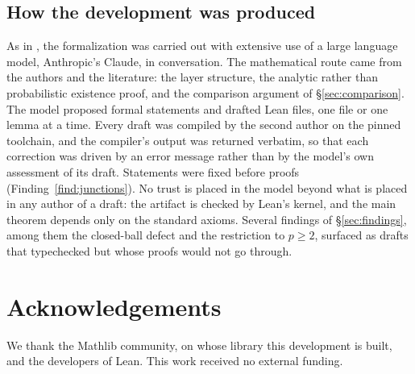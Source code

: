 \documentclass[11pt,reqno]{amsart}
\theoremstyle{plain}
\theoremstyle{definition}
\begin{document}
\subsection{How the development was produced}

As in \cite{AK26}, the formalization was carried out with extensive use of a
large language model, Anthropic's Claude, in conversation. The mathematical
route came from the authors and the literature: the layer structure, the
analytic rather than probabilistic existence proof, and the comparison argument
of \S\ref{sec:comparison}. The model proposed formal statements and drafted Lean
files, one file or one lemma at a time. Every draft was compiled by the second
author on the pinned toolchain, and the compiler's output was returned
verbatim, so that each correction was driven by an error message rather than
by the model's own assessment of its draft. Statements were fixed before proofs
(Finding~\ref{find:junctions}). No trust is placed in the model beyond what is
placed in any author of a draft: the artifact is checked by Lean's kernel, and
the main theorem depends only on the standard axioms. Several findings of
\S\ref{sec:findings}, among them the closed-ball defect and the restriction to
$p \ge 2$, surfaced as drafts that typechecked but whose proofs would not go
through.

\section*{Acknowledgements}
We thank the Mathlib community, on whose library this development is built,
and the developers of Lean. This work received no external funding.



\end{document}
